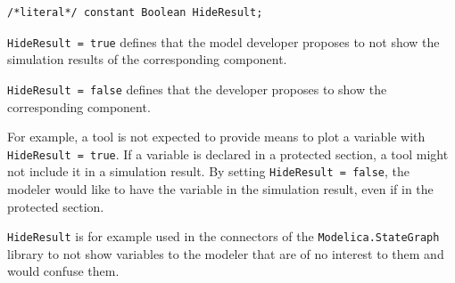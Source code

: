 \begin{annotationdefinition}[HideResult]
\begin{synopsis}\begin{lstlisting}
/*literal*/ constant Boolean HideResult;
\end{lstlisting}\end{synopsis}
\begin{semantics}
\lstinline!HideResult = true! defines that the model developer proposes to not show the simulation results of the corresponding component.

\lstinline!HideResult = false! defines that the developer proposes to show the corresponding component.

\begin{nonnormative}
For example, a tool is not expected to provide means to plot a variable with \lstinline!HideResult = true!.
If a variable is declared in a protected section, a tool might not include it in a simulation result.
By setting \lstinline!HideResult = false!, the modeler would like to have the variable in the simulation result, even if in the protected section.

\lstinline!HideResult! is for example used in the connectors of the \lstinline!Modelica.StateGraph! library to not show variables to the modeler that are of no interest to them and would confuse them.
\end{nonnormative}
\end{semantics}
\end{annotationdefinition}

